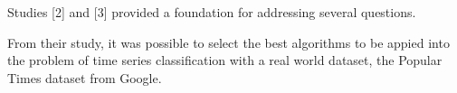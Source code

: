 \documentclass{ieeeaccess}
\begin{document}
Studies [2] and [3] provided a foundation for addressing several questions. 


From their study, it was possible to select the best algorithms to be appied into the problem of time series classification with a real world dataset, the Popular Times dataset from Google.

\cite{middlehurst2024bakeoff}


\end{document}
